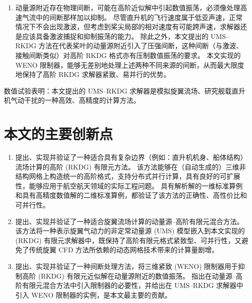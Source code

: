 \begin{enumerate}[wide]
\item 动量源附近存在物理间断，可能在高阶近似解中引起数值振荡，必须像处理高速气流中的间断那样加以抑制。
尽管直升机的飞行速度属于低亚声速，正常情况下不会出现激波，但考虑到桨尖局部的相对速度有可能跨声速，求解器还是应该具备激波捕捉和抑制振荡的能力。
除此之外，本文提出的 UMS–RKDG 方法在代表桨叶的动量源附近引入了压强间断，这种间断（与激波、接触间断类似）对高阶 RKDG 格式亦有压制数值振荡的要求。
本文实现的 WENO 限制器，能够无差别地处理上述两种不同来源的间断，从而最大限度地保持了高阶 RKDG 求解器紧致、易并行的优势。
\end{enumerate}


数值试验表明：本文提出的 UMS–RKDG 求解器是模拟旋翼流场、研究舰载直升机气动干扰的一种高效、高精度的计算方法。


\section*{本文的主要创新点}
\begin{enumerate}[wide]
\item 提出、实现并验证了一种适合具有复杂边界（例如：直升机机身、船体结构）流场计算的高阶 (RKDG) 有限元方法。
该方法能够在（自动生成的）三维非结构网格上构造统一的高阶格式，支持分布式并行计算，具有良好的可扩展性，能够应用于航空航天领域的实际工程问题。
具有解析解的一维标准算例和具有高精度数值解的二维标准算例，都验证了该方法的正确性、高性价比和可并行性。

\item 提出、实现并验证了一种适合旋翼流场计算的动量源–高阶有限元混合方法。
该方法将一种表示旋翼气动力的非定常动量源 (UMS) 模型嵌入到本文实现的 (RKDG) 有限元求解器中，既保持了高阶有限元格式紧致型、可并行性，又避免了传统旋翼 CFD 方法所依赖的动态网格技术带来的计算量剧增。

\item 提出、实现并验证了一种间断处理方法，将三维紧致 (WENO) 限制器用于抑制高阶 (RKDG) 有限元近似解在动量源附近的数值振荡。
指出在动量源–高阶有限元混合方法中引入限制器的必要性，并给出在 UMS–RKDG 求解器中引入 WENO 限制器的实例，是本文最主要的贡献。
\end{enumerate}


